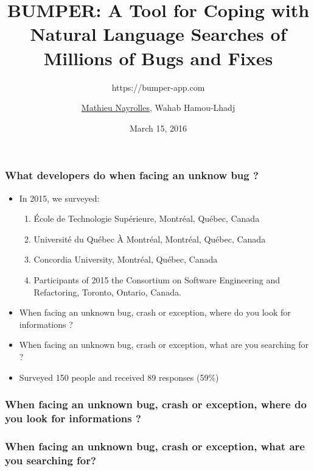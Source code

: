 \documentclass{beamer}
\title[BUMPER]{BUMPER: A Tool for Coping with Natural Language Searches of Millions of Bugs and Fixes} %
\subtitle{https://bumper-app.com}
\author[Mathieu Nayrolles]{\underline{Mathieu Nayrolles}, Wahab Hamou-Lhadj} %
\institute[Concordia] %
{
Software Behaviour Analysis (SBA) Research Lab, ECE,  Concordia, Montr\'eal, Canada
\medskip
\textit{mathieu.nayrolles@gmail.com, wahab.hamou-lhadj@concordia.ca} %
}
\date{March 15, 2016} %
\begin{document}
\begin{frame}
\titlepage %
\end{frame}


\begin{frame}
\frametitle{What developers do when facing an unknow bug ?}

\begin{itemize}
  \item In 2015, we surveyed:
  \begin{enumerate}
    \item \'Ecole de Technologie Sup\'erieure, Montr\'eal, Qu\'ebec, Canada
    \item Universit\'e du Qu\'ebec \`A Montr\'eal, Montr\'eal, Qu\'ebec, Canada
    \item Concordia University, Montr\'eal, Qu\'ebec, Canada
    \item Participants of 2015 the Consortium on Software Engineering and Refactoring, Toronto, Ontario, Canada.
  \end{enumerate}


  \item When facing an unknown bug, crash or exception, where do you look for informations ?
  \item When facing an unknown bug, crash or exception, what are you searching for ?

\item Surveyed 150 people and received 89 responses (59\%)
\end{itemize}

\end{frame}

\begin{frame}
\frametitle{When facing an unknown bug, crash or exception, where do you look
for informations ?}





\end{frame}

\begin{frame}
\frametitle{When facing an unknown bug, crash or exception, what are you
searching for?}



\end{frame}
\end{document}
